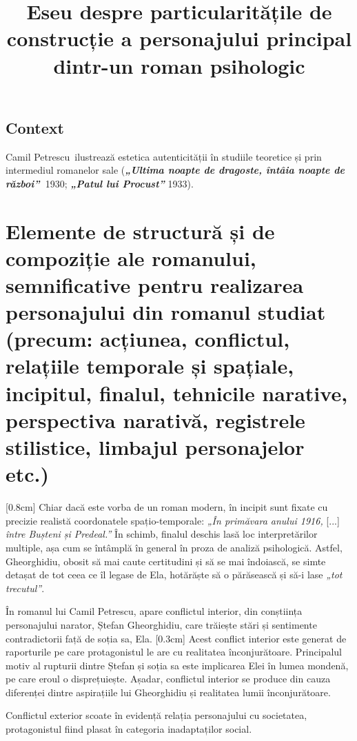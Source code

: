 \documentclass[
12pt,                        %
a4paper                      %
]{article}
\title{Eseu despre particularitățile de construcție a personajului principal dintr-un roman psihologic}
\date{}   %
\author{} %
\newcommand{\operatitle}{\textbf{\textit{„Ultima noapte de dragoste, întâia noapte de război”\ }}} %
\newcommand{\operaauthor}{Camil Petrescu\ } %
\begin{document}
\maketitle %



\subsection{Context}

\operaauthor ilustrează estetica autenticității în studiile teoretice și prin intermediul romanelor sale (\operatitle 1930; \textbf{\textit{„Patul lui Procust”}} 1933).

\section{Elemente de structură și de compoziție ale romanului, semnificative pentru realizarea personajului din romanul studiat {\footnotesize (precum: acțiunea, conflictul, relațiile temporale și spațiale, incipitul, finalul, tehnicile narative, perspectiva narativă, registrele stilistice, limbajul personajelor etc.)}}

[0.8cm]
Chiar dacă este vorba de un roman modern, în incipit sunt fixate cu precizie realistă coordonatele spațio-temporale: \textit{„În primăvara anului 1916,} [...] \textit{între Bușteni și Predeal.”} În schimb, finalul deschis lasă loc interpretărilor multiple, așa cum se întâmplă în general în proza de analiză psihologică. Astfel, Gheorghidiu, obosit să mai caute certitudini și să se mai îndoiască, se simte detașat de tot ceea ce îl legase de Ela, hotărăște să o părăsească și să-i lase \textit{„tot trecutul”}.

În romanul lui Camil Petrescu, apare conflictul interior, din conștiința personajului narator, Ștefan Gheorghidiu, care trăiește stări și sentimente contradictorii față de soția sa, Ela.
[0.3cm]
Acest conflict interior este generat de raporturile pe care protagonistul le are cu realitatea înconjurătoare. Principalul motiv al rupturii dintre Ștefan și soția sa este implicarea Elei în lumea mondenă, pe care eroul o disprețuiește. Așadar, conflictul interior se produce din cauza diferenței dintre aspirațiile lui Gheorghidiu și realitatea lumii înconjurătoare.

Conflictul exterior scoate în evidență relația personajului cu societatea, protagonistul fiind plasat în categoria inadaptaților social.
\end{document}
